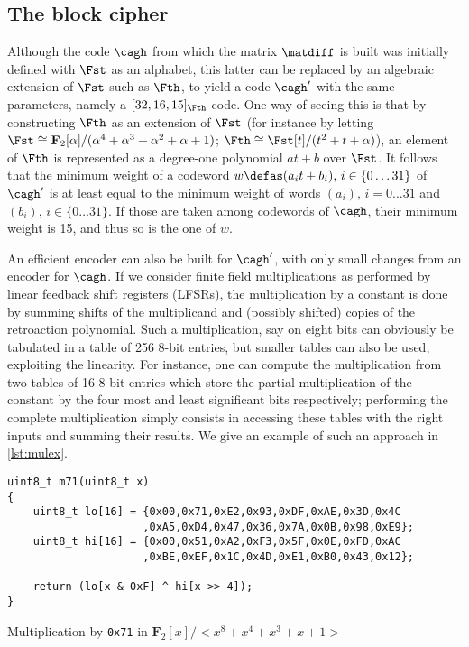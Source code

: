 \subsection{The \eric block cipher}
Although the code $\cagh$ from which the matrix $\matdiff$ is built was initially defined with $\Fst$ as an alphabet, this latter
can be replaced by an algebraic extension of $\Fst$ such as $\Fth$, to yield a code $\cagh'$ with the same parameters,
namely a $[32, 16, 15]_{\Fth}$ code. One way of seeing this is that by constructing $\Fth$ as an extension of $\Fst$
(for instance by letting $\Fst \cong \mathbf{F}_2[\alpha]/(\alpha^4 + \alpha^3 + \alpha^2 + \alpha + 1)$;
$\Fth \cong \Fst[t]/(t^2 + t + \alpha)$), an
element of $\Fth$ is represented as a degree-one polynomial $at + b$ over $\Fst$.
It follows that the minimum weight of a codeword $w \defas (a_i t + b_i),\,i \in \{0\ldots31\}$ of $\cagh'$ is at least equal to the
minimum weight of words $(a_i),\,i = 0\ldots31$ and $(b_i),\,i \in \{0\ldots31\}$.
If those are taken among codewords
of $\cagh$, their minimum weight is 15, and thus so is the one of $w$.

An efficient encoder can also be built for $\cagh'$, with only small changes from an encoder for $\cagh$.
If we consider finite field multiplications as performed by linear feedback shift registers (LFSRs), the multiplication by
a constant is done by summing shifts of the multiplicand and (possibly shifted) copies of the retroaction polynomial. Such a
multiplication, say on eight bits can obviously be tabulated in a table of 256 8-bit entries, but smaller tables can also
be used, exploiting the linearity. For instance, one can compute the multiplication from two tables of 16 8-bit entries which store the partial
multiplication of the constant by the four most and least significant bits respectively; performing the complete multiplication
simply consists in accessing these tables with the right inputs and summing their results. We give an example of such
an approach
in \autoref{lst:mulex}.

\begin{listing}[!htb]
\begin{center}
\begin{verbatim}
uint8_t m71(uint8_t x)
{
    uint8_t lo[16] = {0x00,0x71,0xE2,0x93,0xDF,0xAE,0x3D,0x4C
                     ,0xA5,0xD4,0x47,0x36,0x7A,0x0B,0x98,0xE9};
    uint8_t hi[16] = {0x00,0x51,0xA2,0xF3,0x5F,0x0E,0xFD,0xAC
                     ,0xBE,0xEF,0x1C,0x4D,0xE1,0xB0,0x43,0x12};

    return (lo[x & 0xF] ^ hi[x >> 4]);
}
\end{verbatim}
\end{center}
\caption{Multiplication by \texttt{0x71} in $\mathbf{F}_{2}[x]/<x^8+x^4+x^3+x+1>$\label{lst:mulex}}
\end{listing}

